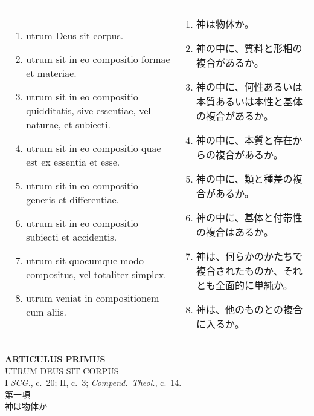 \documentclass[10pt]{jsarticle} %
\begin{document}
\begin{longtable}{p{21em}p{21em}}
\begin{enumerate}
 \item utrum Deus sit corpus.
 \item utrum sit in eo compositio formae et materiae. 
 \item utrum sit in eo compositio quidditatis, sive
essentiae, vel naturae, et subiecti.
 \item utrum sit in eo compositio quae est ex essentia et esse.
 \item utrum sit in eo compositio generis et differentiae. 
 \item utrum sit in eo compositio subiecti et accidentis.
 \item utrum sit quocumque modo compositus, vel totaliter
simplex.
 \item utrum veniat in compositionem cum aliis.
\end{enumerate}

&

\begin{enumerate}
 \item 神は物体か。
 \item 神の中に、質料と形相の複合があるか。
 \item 神の中に、何性あるいは本質あるいは本性と基体の複合があるか。
 \item 神の中に、本質と存在からの複合があるか。
 \item 神の中に、類と種差の複合があるか。
 \item 神の中に、基体と付帯性の複合はあるか。
 \item 神は、何らかのかたちで複合されたものか、それとも全面的に単純か。
 \item 神は、他のものとの複合に入るか。
\end{enumerate}


\end{longtable}

\newpage
{}
\begin{center}
 {\Large {\bf ARTICULUS PRIMUS}}\\
 {\large UTRUM DEUS SIT CORPUS}\\
 {\footnotesize I {\it SCG.}, c.~20; II, c.~3; {\it Compend.~Theol.},
 c.~14.}\\
{\Large 第一項\\神は物体か}
\end{center}
\end{document}
